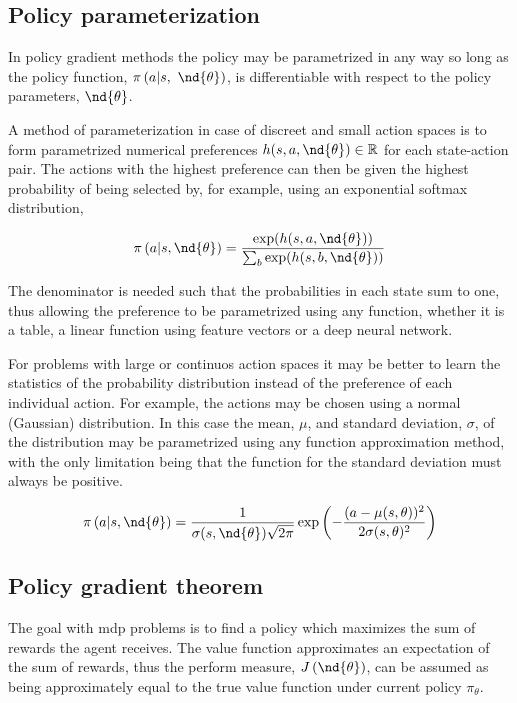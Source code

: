 \subsection{Policy parameterization}
In policy gradient methods the policy may be parametrized in any way so long as the policy function, $\pi\left(a|s,\ \nd{\theta}\right )$, is differentiable with respect to the policy parameters, $\nd{\theta}$. 

A method of parameterization in case of discreet and small action spaces is to form parametrized numerical preferences $h(s, a, \nd{\theta}) \in \mathbb{R}$ for each state-action pair. The actions with the highest preference can then be given the highest probability of being selected by, for example, using an exponential softmax distribution,

\begin{equation}
  \pi\left(a|s, \nd{\theta}\right)=\frac{\exp(h(s, a, \nd{\theta}))}{\sum_b\exp(h(s, b, \nd{\theta}))}
\end{equation}

The denominator is needed such that the probabilities in each state sum to one, thus allowing the preference to be parametrized using any function, whether it is a table, a linear function using feature vectors or a deep neural network.

For problems with large or continuos action spaces it may be better to learn the statistics of the probability distribution instead of the preference of each individual action. For example, the actions may be chosen using a normal (Gaussian) distribution. In this case the mean, $\mu$, and standard deviation, $\sigma$, of the distribution may be parametrized using any function approximation method, with the only limitation being that the function for the standard deviation must always be positive.

\begin{equation}
  \pi\left(a|s, \nd{\theta}\right)=\frac{1}{\sigma(s, \nd{\theta})\sqrt{2\pi}}\exp\left(-\frac{(a-\mu(s, \theta))^2}{2\sigma(s, \theta)^2}\right)
\end{equation}

\subsection{Policy gradient theorem}

The goal with \gls{mdp} problems is to find a policy which maximizes the sum of rewards the agent receives. The value function approximates an expectation of the sum of rewards, thus the perform measure, $J\left(\nd{\theta}\right)$, can be assumed as being approximately equal to the true value function under current policy $\pi_\theta$.

